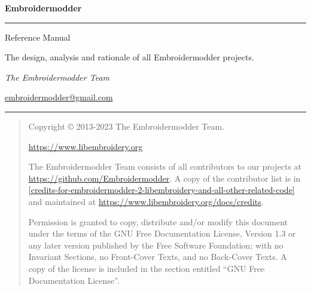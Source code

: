 \begin{titlepage}

\vspace*{8cm}

\noindent\textbf{\Huge Embroidermodder}

\vspace{10pt}

\noindent\rule{\linewidth}{2pt}

\vspace{10pt}

\begin{flushright}
\Large
    Reference Manual

\normalsize
    The design, analysis and rationale of all Embroidermodder projects.

\embversion

\publicationdate
\end{flushright}

\vspace{6cm}

\begin{flushleft}
\Large
\emph{The Embroidermodder Team}

\url{embroidermodder@gmail.com}

\vspace{10pt}

\noindent\rule{\linewidth}{1pt}

\end{flushleft}
    
\end{titlepage}


\vspace*{8cm}

\begin{quote}
Copyright \copyright{} 2013-2023 The Embroidermodder Team.

\url{https://www.libembroidery.org}

The Embroidermodder Team consists of all contributors to our projects
at \url{https://github.com/Embroidermodder}. A copy of the contributor
list is in
\ref{credits-for-embroidermodder-2-libembroidery-and-all-other-related-code}
and maintained at \url{https://www.libembroidery.org/docs/credits}.

\bigskip

Permission is granted to copy, distribute and/or modify this document
under the terms of the GNU Free Documentation License, Version 1.3
or any later version published by the Free Software Foundation;
with no Invariant Sections, no Front-Cover Texts, and no Back-Cover Texts.
A copy of the license is included in the section entitled ``GNU
Free Documentation License''.
\end{quote}

